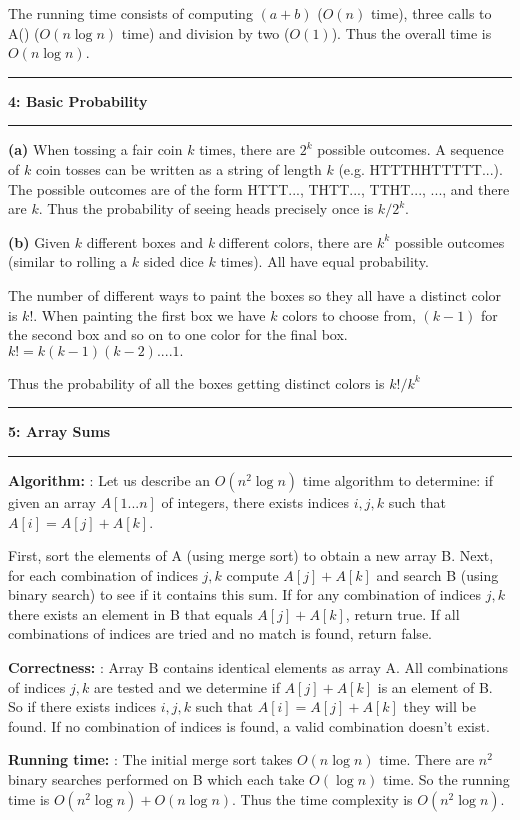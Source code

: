 \documentclass[11pt]{article}
\newcommand\question[2]{\vspace{.25in}\hrule\textbf{#1: #2}\vspace{.5em}\hrule\vspace{.10in}}
\renewcommand\part[1]{\vspace{.10in}\textbf{(#1)}}
\newcommand\algorithm{\vspace{.10in}\textbf{Algorithm: }}
\newcommand\correctness{\vspace{.10in}\textbf{Correctness: }}
\newcommand\runtime{\vspace{.10in}\textbf{Running time: }}
\begin{document}
The running time consists of computing $(a + b)$ ($O(n)$ time), three calls to A() ($O(n \log n)$ time) and division by two ($O(1)$). Thus the overall time is $O(n \log n)$.

\newpage
\question{4}{Basic Probability}

\part{a} When tossing a fair coin $k$ times, there are $2^k$ possible outcomes. A sequence of $k$ coin tosses can be written as a string of length $k$ (e.g. HTTTHHTTTTT...). The possible outcomes are of the form HTTT..., THTT..., TTHT..., ..., and there are $k$. Thus the probability of seeing heads precisely once is $k/2^k$.

\part{b} Given $k$ different boxes and \emph{k} different colors, there are $k^k$ possible outcomes (similar to rolling a $k$ sided dice $k$ times). All have equal probability. 

The number of different ways to paint the boxes so they all have a distinct color is $k!$. When painting the first box we have $k$ colors to choose from, $(k-1)$ for the second box and so on to one color for the final box. $k! = k(k-1)(k-2)....1.$

Thus the probability of all the boxes getting distinct colors is $k!/k^k$

\question{5}{Array Sums}

\algorithm: Let us describe an $O(n^2 \log n)$ time algorithm to determine: if given an array $A[1...n]$ of integers, there exists indices $i,j,k$ such that $A[i] = A[j] + A[k]$.

First, sort the elements of A (using merge sort) to obtain a new array B. Next, for each combination of indices $j,k$ compute $A[j] + A[k]$ and search B (using binary search) to see if it contains this sum. If for any combination of indices $j,k$ there exists an element in B that equals $A[j] + A[k]$, return true. If all combinations of indices are tried and no match is found, return false.

\correctness: Array B contains identical elements as array A. All combinations of indices $j,k$ are tested and we determine if $A[j] + A[k]$ is an element of B. So if there exists indices $i,j,k$ such that $A[i] = A[j] + A[k]$ they will be found. If no combination of indices is found, a valid combination doesn't exist.

\runtime: The initial merge sort takes $O(n \log n)$ time. There are $n^2$ binary searches performed on B which each take $O(\log n)$ time. So the running time is $O(n^2 \log n) + O(n \log n)$. Thus the time complexity is $O(n^2 \log n)$. 
\end{document}
